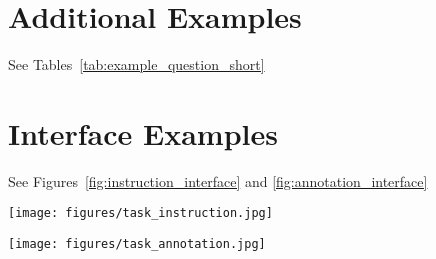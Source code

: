 \section{Additional Examples}
\label{app:additional_examples}

See Tables~\ref{tab:example_question_short}

\section{Interface Examples}
\label{app:interface}
See Figures~\ref{fig:instruction_interface} and \ref{fig:annotation_interface}
\begin{figure*}
    \centering
    \texttt{[image: figures/task\_instruction.jpg]}
    \caption{Human Evaluation Interface - Task Instructions and Examples.}
    \label{fig:instruction_interface}
\end{figure*}

\begin{figure*}
    \centering
    \texttt{[image: figures/task\_annotation.jpg]}
    \caption{Human Evaluation Interface - Annotation.}
    \label{fig:annotation_interface}
\end{figure*}